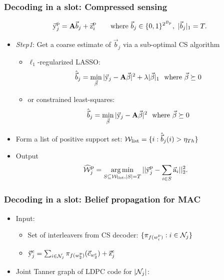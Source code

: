 \documentclass[10pt]{beamer}
\def\mac_figpath{../Figures/MAC}
\begin{document}
\begin{frame}\frametitle{Decoding in a slot: Compressed sensing}
	\begin{align*}
	\vec{\mathrm{y}}^{\mathrm{p}}_j	=\mathbf{A}\vec{b}_j+\vec{\mathrm{z}}^{\mathrm{p}}_i \qquad \text{where }\vec{b}_j\in\{0,1\}^{2^{B_{\mathrm{p}}}},~ |\vec{b}_j|_1=T.
	\end{align*}

\begin{itemize}
\item \emph{Step1}: Get a coarse estimate of $\vec{b}_j$ via a sub-optimal CS algorithm
	\begin{itemize}
	\item $\ell_1$-regularized LASSO: 
	\begin{align*}
		\hat{\vec{b}}_j&=\min_{\vec{\beta}} |\vec{\mathrm{y}}_j-\mathbf{A}\vec{\beta}|^2+\lambda |\vec{\beta}|_1~\text{ where }\vec{\beta} \succeq 0
	\end{align*}

	\item or constrained least-squares: 
	\begin{align*}
		\hat{\vec{b}}_j &=\min_{\vec{\beta}} |\vec{\mathrm{y}}_j-\mathbf{A}\vec{\beta}|^2 ~\text{ where }\vec{\beta} \succeq 0
	\end{align*}

	\end{itemize}
\pause
\item Form a list of positive support set: $\mathcal{W}_{\text{list}}=\{i:\hat{\vec{b}}_j(i)>\eta_{Th}\}$
\item Output 
\[
\widehat{\mathcal{W}}_j^{\mathrm{p}}=\operatorname*{arg\,min}_{S\subseteq\mathcal{W}_{\text{list}},|S|=T}||\vec{\mathrm{y}}_j^{\mathrm{p}}-\sum_{i\in S}\vec{\mathrm{a}}_i||^2_2.
\]
\end{itemize}





\end{frame}


\begin{frame}\frametitle{Decoding in a slot: Belief propagation for MAC }
\begin{itemize}
	\item Input:
	\begin{itemize}
 	\item Set of interleavers from CS decoder: $\{\pi_{f(w^\mathrm{p}_i)}: i\in\mathcal{N}_j\}$
	\item  $\vec{\mathrm{y}}^{\mathrm{c}}_j=\sum_{i\in\mathcal{N}_j} \pi_{f(w^\mathrm{p}_2)}(\vec{c}_{w^\mathrm{c}_2}) +\vec{\mathrm{z}}^{\mathrm{c}}_j$
	\end{itemize}
	\item<2-> Joint Tanner graph of LDPC code for $|\mathcal{N}_j|$:
\end{itemize}
\end{frame}
\end{document}

